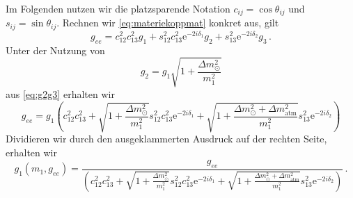 Im Folgenden nutzen wir die platzsparende Notation $c_{ij} = \cos{\theta_{ij}}$ und $s_{ij} = \sin{\theta_{ij}}$.
Rechnen wir \eqref{eq:materiekoppmat} konkret aus, gilt
\begin{equation}
    g_{ee} = c^2_{1 2} c^2_{1 3} g_1 + s^2_{12} c^2_{13} \mathrm{e}^{-2 i \delta_1} g_2 + s^2_{13} \mathrm{e}^{-2 i \delta_2}  g_3 \,.
    \label{eq:g_ee}
\end{equation}
Unter der Nutzung von
\begin{equation*}
    g_2 = g_1 \sqrt{1 + \frac{\Delta m^2_\odot}{m^2_1}}
\end{equation*}
aus \eqref{eq:g2g3} erhalten wir
\begin{equation*}
    g_{ee} = g_1 \left(c^2_{1 2} c^2_{1 3} + \sqrt{1 + \frac{\Delta m^2_\odot}{m^2_1}}s^2_{12} c^2_{13} \mathrm{e}^{-2 i \delta_1} + \sqrt{1 + \frac{\Delta m^2_\odot + \Delta m^2_\text{atm}}{m^2_1}} s^2_{13} \mathrm{e}^{-2 i \delta_2}\right)
\end{equation*}
Dividieren wir durch den ausgeklammerten Ausdruck auf der rechten Seite, erhalten wir
\begin{equation}
    g_1(m_1,g_{ee}) = \frac{g_{ee}}{\left(c^2_{1 2} c^2_{1 3} + \sqrt{1 + \frac{\Delta m^2_\odot}{m^2_1}}s^2_{12} c^2_{13} \mathrm{e}^{-2 i \delta_1} + \sqrt{1 + \frac{\Delta m^2_\odot + \Delta m^2_\text{atm}}{m^2_1}} s^2_{13} \mathrm{e}^{-2 i \delta_2}\right)} \,.
    \label{eq:g_1g_ee}
\end{equation}

